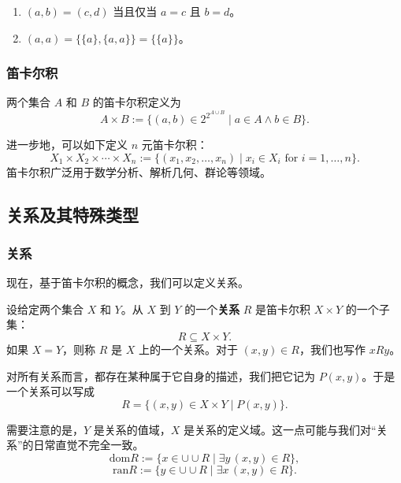 \begin{inference}
\begin{enumerate}
\item $(a,b)=(c,d)$ 当且仅当 $a=c$ 且 $b=d$。

\item $(a,a)=\{\{a\},\{a,a\}\}=\{\{a\}\}$。
\end{enumerate}
\end{inference}

\subsubsection{笛卡尔积}

\begin{definition}[笛卡尔积]
两个集合 $A$ 和 $B$ 的笛卡尔积定义为
\[
A\times B:=\{(a,b)\in 2^{2^{A\cup B}}\mid a\in A\wedge b\in B\}.
\]
\end{definition}

进一步地，可以如下定义 $n$ 元笛卡尔积：
\[
X_1\times X_2\times\cdots\times X_n:=\{(x_1,x_2,\dots,x_n)\mid x_i\in X_i\text{ for }i=1,\dots,n\}.
\]
笛卡尔积广泛用于数学分析、解析几何、群论等领域。

\subsection{关系及其特殊类型}

\subsubsection{关系}

现在，基于笛卡尔积的概念，我们可以定义关系。

\begin{definition}[关系]
设给定两个集合 $X$ 和 $Y$。从 $X$ 到 $Y$ 的一个\textbf{关系} $R$ 是笛卡尔积 $X\times Y$ 的一个子集：
\[
R\subseteq X\times Y.
\]
如果 $X=Y$，则称 $R$ 是 $X$ 上的一个关系。对于 $(x,y)\in R$，我们也写作 $xRy$。
\end{definition}

对所有关系而言，都存在某种属于它自身的描述，我们把它记为 $P(x,y)$。于是一个关系可以写成
\[
R=\{(x,y)\in X\times Y\mid P(x,y)\}.
\]

\begin{remark}
需要注意的是，$Y$ 是关系的值域，$X$ 是关系的定义域。这一点可能与我们对“关系”的日常直觉不完全一致。
\[
\text{dom}R:=\{x\in \cup\cup R\mid \exists y\,(x,y)\in R\},
\]
\[
\text{ran}R:=\{y\in \cup\cup R\mid \exists x\,(x,y)\in R\}.
\]
\end{remark}

